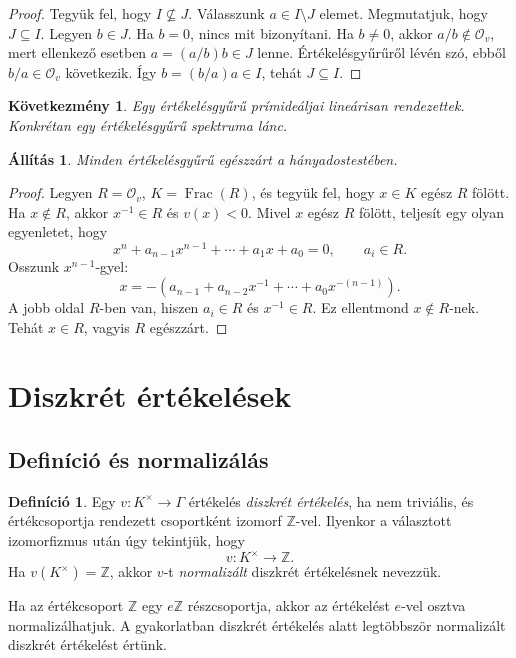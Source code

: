 \documentclass[11pt,a4paper]{article}
\newtheorem{allitas}[tetel]{Állítás}
\newtheorem{kovetkezmeny}[tetel]{Következmény}
\theoremstyle{definition}
\newtheorem{definicio}[tetel]{Definíció}
\DeclareMathOperator{\Frac}{Frac}
\newcommand{\OO}{\mathcal O}
\newcommand{\ZZ}{\mathbb Z}
\begin{document}
\begin{proof}
Tegyük fel, hogy $I\not\subseteq J$. Válasszunk $a\in I\setminus J$
elemet. Megmutatjuk, hogy $J\subseteq I$. Legyen $b\in J$. Ha
$b=0$, nincs mit bizonyítani. Ha $b\neq 0$, akkor $a/b\notin\OO_v$,
mert ellenkező esetben $a=(a/b)b\in J$ lenne. Értékelésgyűrűről
lévén szó, ebből $b/a\in\OO_v$ következik. Így
$b=(b/a)a\in I$, tehát $J\subseteq I$.
\end{proof}

\begin{kovetkezmeny}
Egy értékelésgyűrű prímideáljai lineárisan rendezettek. Konkrétan
egy értékelésgyűrű spektruma lánc.
\end{kovetkezmeny}

\begin{allitas}
Minden értékelésgyűrű egészzárt a hányadostestében.
\end{allitas}

\begin{proof}
Legyen $R=\OO_v$, $K=\Frac(R)$, és tegyük fel, hogy
$x\in K$ egész $R$ fölött. Ha $x\notin R$, akkor
$x^{-1}\in R$ és $v(x)<0$. Mivel $x$ egész $R$ fölött, teljesít egy
olyan egyenletet, hogy
\[
  x^n+a_{n-1}x^{n-1}+\cdots+a_1x+a_0=0,
  \qquad a_i\in R.
\]
Osszunk $x^{n-1}$-gyel:
\[
  x=-(a_{n-1}+a_{n-2}x^{-1}+\cdots+a_0x^{-(n-1)}).
\]
A jobb oldal $R$-ben van, hiszen $a_i\in R$ és $x^{-1}\in R$. Ez
ellentmond $x\notin R$-nek. Tehát $x\in R$, vagyis $R$ egészzárt.
\end{proof}

\section{Diszkrét értékelések}

\subsection{Definíció és normalizálás}

\begin{definicio}
Egy $v:K^\times\to\Gamma$ értékelés \emph{diszkrét értékelés}, ha
nem triviális, és értékcsoportja rendezett csoportként izomorf
$\ZZ$-vel. Ilyenkor a választott izomorfizmus után úgy tekintjük, hogy
\[
  v:K^\times\longrightarrow \ZZ.
\]
Ha $v(K^\times)=\ZZ$, akkor $v$-t \emph{normalizált} diszkrét
értékelésnek nevezzük.
\end{definicio}

Ha az értékcsoport $\ZZ$ egy $e\ZZ$ részcsoportja, akkor az értékelést
$e$-vel osztva normalizálhatjuk. A gyakorlatban diszkrét értékelés
alatt legtöbbször normalizált diszkrét értékelést értünk.
\end{document}
